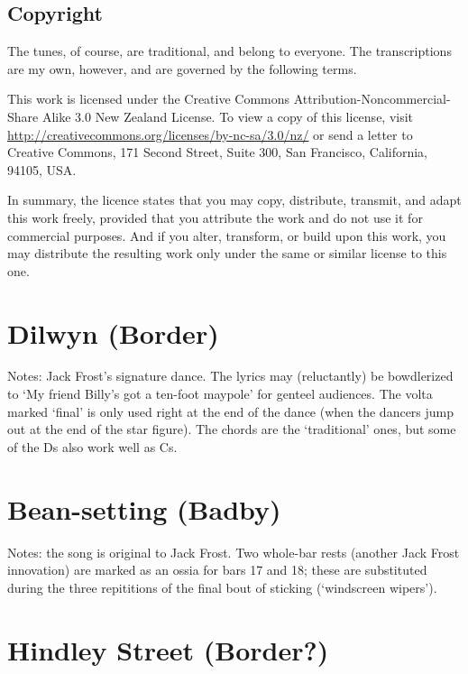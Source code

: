 \documentclass[12pt,a4paper]{article}
\begin{document}
\subsection*{Copyright}

The tunes, of course, are traditional, and belong to everyone. The 
transcriptions are my own, however, and are governed by the following terms.

This work is licensed under the Creative Commons
Attribution-Noncommercial-Share Alike 3.0 New Zealand License. To view
a copy of this license, visit
\url{http://creativecommons.org/licenses/by-nc-sa/3.0/nz/} or send a
letter to Creative Commons, 171 Second Street, Suite 300, San
Francisco, California, 94105, USA.

In summary, the licence states that you may copy, distribute,
transmit, and adapt this work freely, provided that you attribute the
work and do not use it for commercial purposes. And if you alter,
transform, or build upon this work, you may distribute the resulting
work only under the same or similar license to this one.

\pagebreak[2]

\section{Dilwyn (Border)}

\noindent Notes: Jack Frost's signature dance. The lyrics may (reluctantly) be
bowdlerized to `My friend Billy's got a ten-foot maypole' for genteel
audiences. The volta marked `final' is only used right at the end of
the dance (when the dancers jump out at the end of the star
figure). The chords are the `traditional' ones, but some of the Ds
also work well as Cs.

\pagebreak[2]

\section{Bean-setting (Badby)}
\nopagebreak
\noindent Notes: the song is original to Jack Frost. Two whole-bar
rests (another Jack Frost innovation) are marked as an ossia for bars
17 and 18; these are substituted during the three repititions of the
final bout of sticking (`windscreen wipers').

\nopagebreak
\section{Hindley Street (Border?)}
\end{document}
